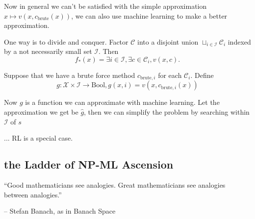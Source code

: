 \documentclass[9pt, oneside]{article}   	%
\theoremstyle{definition}
\begin{document}
Now in general we can't be satisfied with the simple approximation $x\mapsto v(x,c_{\text{brute}}(x))$, we can also use machine learning to make a better approximation.

One way is to divide and conquer. Factor $\mathcal{C}$ into a disjoint union $\sqcup_{i\in \mathcal{I}} \mathcal{C}_{i}$ indexed by a not necessarily small set $\mathcal{I}$. Then
\begin{equation}
	f_*(x)=\exists i\in \mathcal{I}, \exists c\in \mathcal{C}_i, v(x,c).
\end{equation}

Suppose that we have a brute force method $c_{\text{brute},i}$ for each $\mathcal{C}_i$. Define
\begin{equation}
	g: \mathcal{X}\times \mathcal{I} \rightarrow \text{Bool}, g(x, i) = v(x, c_{\text{brute},i}(x))
\end{equation}

Now $g$ is a function we can approximate with machine learning. Let the approximation we get be $\hat{g}$, then we can simplify the problem by searching within $\mathcal{I}$ of $s$

... RL is a special case.

\subsection{the Ladder of NP-ML Ascension}
``Good mathematicians see analogies. Great mathematicians see analogies between analogies.''

\hfill -- Stefan Banach, as in Banach Space


\begin{center}
\end{center}
\end{document}
